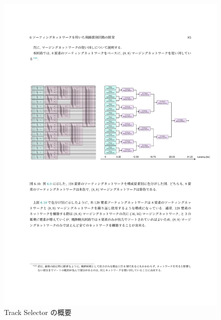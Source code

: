 \begin{figure} 
    \centering
    \includegraphics[width=16cm]{fig/SL/TrackSelector_overview.pdf}
    \caption[Track Selector の概要]{Track Selector の概要}
    \label{TrackSelector_overview}  
\end{figure}
    

